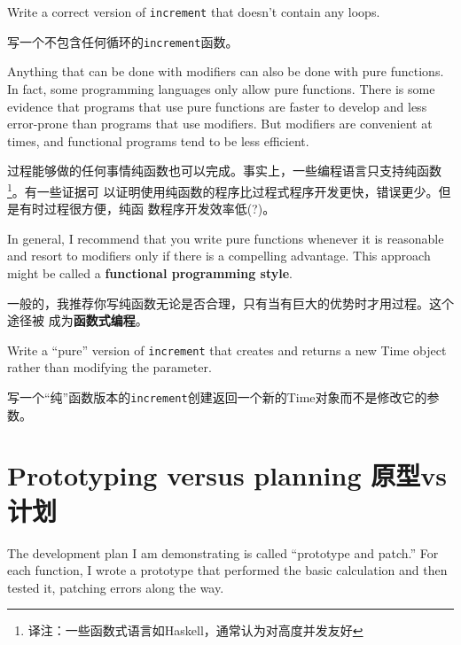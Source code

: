 \documentclass[10pt]{book}
\begin{document}
\begin{CJK}{UTF8}{gbsn}
\begin{exercise}

Write a correct version of {\tt increment} that
doesn't contain any loops.

写一个不包含任何循环的{\tt increment}函数。

\end{exercise}

Anything that can be done with modifiers can also be done with pure
functions.  In fact, some programming languages only allow pure
functions.  There is some evidence that programs that use pure
functions are faster to develop and less error-prone than programs
that use modifiers.  But modifiers are convenient at times,
and functional programs tend to be less efficient.

过程能够做的任何事情纯函数也可以完成。事实上，一些编程语言只支持纯函数
\footnote{译注：一些函数式语言如Haskell，通常认为对高度并发友好}。有一些证据可
以证明使用纯函数的程序比过程式程序开发更快，错误更少。但是有时过程很方便，纯函
数程序开发效率低(?)。

In general, I recommend that you write pure functions whenever it is
reasonable and resort to modifiers only if there is a compelling
advantage.  This approach might be called a {\bf functional
programming style}.

一般的，我推荐你写纯函数无论是否合理，只有当有巨大的优势时才用过程。这个途径被
成为{\bf 函数式编程}。


\begin{exercise}

Write a ``pure'' version of {\tt increment} that creates and returns
a new Time object rather than modifying the parameter.

写一个``纯''函数版本的{\tt increment}创建返回一个新的Time对象而不是修改它的参数。

\end{exercise}


\section{Prototyping versus planning 原型vs 计划}
\label{prototype}

The development plan I am demonstrating is called ``prototype and
patch.''  For each function, I wrote a prototype that performed the
basic calculation and then tested it, patching errors along the
way.


\end{CJK}
\end{document}
